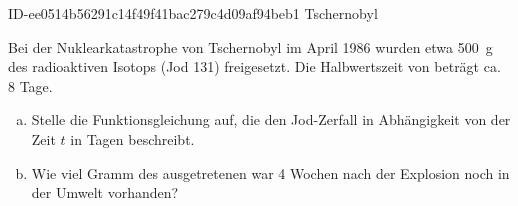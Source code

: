 \begin{exercise}
      {ID-ee0514b56291c14f49f41bac279c4d09af94beb1}
      {Tschernobyl}
  \ifproblem\problem\par
    Bei der Nuklearkatastrophe von Tschernobyl
    im April 1986 wurden etwa \SI{500}{\gram}
    des radioaktiven Isotops 
    (\glqq Jod 131\grqq) freigesetzt.
    Die Halbwertszeit von 
    beträgt ca. \num{8} Tage.
    \begin{enumerate}[a)]
      \item Stelle die Funktionsgleichung auf, die
            den Jod-Zerfall in Abhängigkeit von der
            Zeit $t$ in Tagen beschreibt.
      \item Wie viel Gramm des ausgetretenen
             war \num{4} Wochen
            nach der Explosion noch in der Umwelt
            vorhanden?
    \end{enumerate}
  \fi
\end{exercise}
